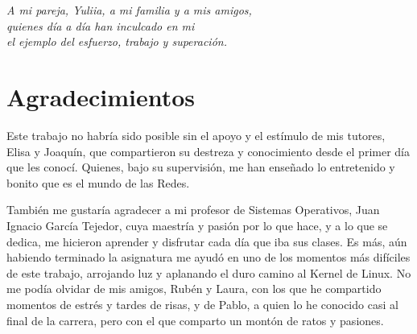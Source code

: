 

\cleardoublepage %
\chapter*{}
\setlength{\leftmargin}{0.5\textwidth}
\setlength{\parsep}{0cm}
\addtolength{\topsep}{0.5cm}
\begin{flushright}
	\small\em{
		A mi pareja, Yuliia, a mi familia y a mis amigos,\\
		quienes día a día han inculcado en mi \\
		el ejemplo del esfuerzo, trabajo y superación.
	}
\end{flushright}




\chapter*{Agradecimientos}

\thispagestyle{empty}
\vspace{1cm}

Este trabajo no habría sido posible sin el apoyo y el estímulo de mis tutores, Elisa y Joaquín, que compartieron su destreza y conocimiento desde el primer día que les conocí. Quienes, bajo su supervisión, me han enseñado lo entretenido y bonito que es el mundo de las Redes. \newline

También me gustaría agradecer a mi profesor de Sistemas Operativos, Juan Ignacio García Tejedor, cuya maestría y pasión por lo que hace, y a lo que se dedica, me hicieron aprender y disfrutar cada día que iba sus clases. Es más, aún habiendo terminado la asignatura me ayudó en uno de los momentos más difíciles de este trabajo, arrojando luz y aplanando el duro camino al Kernel de Linux. No me podía olvidar de mis amigos, Rubén y Laura, con los que he compartido momentos de estrés y tardes de risas, y de Pablo, a quien lo he conocido casi al final de la carrera, pero con el que comparto un montón de ratos y pasiones. \newline

